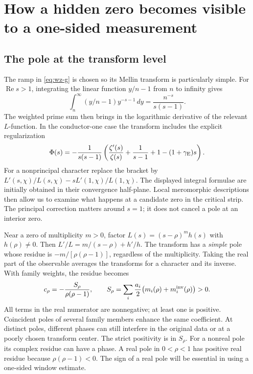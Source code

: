 \documentclass[12pt,letterpaper]{article}
\begin{document}
\section{How a hidden zero becomes visible to a one-sided measurement}
\subsection{The pole at the transform level}
The ramp in \eqref{eq:wz-g} is chosen so its Mellin transform is particularly simple. For \(\operatorname{Re}s>1\), integrating the linear function \(y/n-1\) from \(n\) to infinity gives
\[
 \int_n^\infty (y/n-1)y^{-s-1}\,dy=\frac{n^{-s}}{s(s-1)}.
\]
The weighted prime sum then brings in the logarithmic derivative of the relevant \(L\)-function. In the conductor-one case the transform includes the explicit regularization
\[
 \Phi(s)=-\frac{1}{s(s-1)}
       \left(\frac{\zeta'(s)}{\zeta(s)}
       +\frac{1}{s-1}+1-(1+\gamma_{\rm E})s\right).
\]
For a nonprincipal character replace the bracket by
\(L'(s,\chi)/L(s,\chi)-sL'(1,\chi)/L(1,\chi)\). The displayed integral formulae are initially obtained in their convergence half-plane. Local meromorphic descriptions then allow us to examine what happens at a candidate zero in the critical strip. The principal correction matters around \(s=1\); it does not cancel a pole at an interior zero.   

Near a zero of multiplicity \(m>0\), factor \(L(s)=(s-\rho)^m h(s)\) with \(h(\rho)\ne0\). Then \(L'/L=m/(s-\rho)+h'/h\). The transform has a \emph{simple} pole whose residue is \(-m/[\rho(\rho-1)]\), regardless of the multiplicity. Taking the real part of the observable averages the transforms for a character and its inverse. With family weights, the residue becomes
\[
  c_\rho=-\frac{S_\rho}{\rho(\rho-1)},\qquad
  S_\rho=\sum_i\frac{a_i}{2}\bigl(m_i(\rho)+m_i^{\rm inv}(\rho)\bigr)>0 .
\]
All terms in the real numerator are nonnegative; at least one is positive. Coincident poles of several family members enhance the same coefficient. At distinct poles, different phases can still interfere in the original data or at a poorly chosen transform center. The strict positivity is in \(S_\rho\). For a nonreal pole its complex residue can have a phase. A real pole in \(0<\rho<1\) has positive real residue because \(\rho(\rho-1)<0\). The sign of a real pole will be essential in using a one-sided window estimate.  
\end{document}
